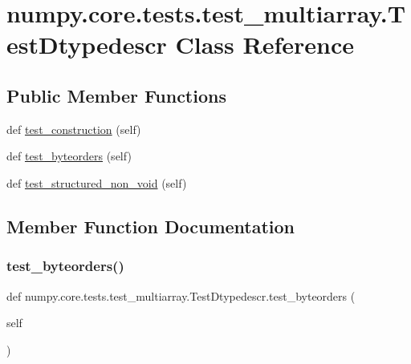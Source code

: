 \hypertarget{classnumpy_1_1core_1_1tests_1_1test__multiarray_1_1TestDtypedescr}{}\section{numpy.\+core.\+tests.\+test\+\_\+multiarray.\+Test\+Dtypedescr Class Reference}
\label{classnumpy_1_1core_1_1tests_1_1test__multiarray_1_1TestDtypedescr}
\subsection*{Public Member Functions}
\begin{DoxyCompactItemize}
\item 
def \hyperlink{classnumpy_1_1core_1_1tests_1_1test__multiarray_1_1TestDtypedescr_a2d9b634b5a250aa2f56396d16b736e64}{test\+\_\+construction} (self)
\item 
def \hyperlink{classnumpy_1_1core_1_1tests_1_1test__multiarray_1_1TestDtypedescr_ae4485cca283de87d7e1fa61ab35105ea}{test\+\_\+byteorders} (self)
\item 
def \hyperlink{classnumpy_1_1core_1_1tests_1_1test__multiarray_1_1TestDtypedescr_a8e3d8e0d8ea78920395046af8f336c27}{test\+\_\+structured\+\_\+non\+\_\+void} (self)
\end{DoxyCompactItemize}


\subsection{Member Function Documentation}
\mbox{\label{classnumpy_1_1core_1_1tests_1_1test__multiarray_1_1TestDtypedescr_ae4485cca283de87d7e1fa61ab35105ea}} 
\subsubsection{\texorpdfstring{test\+\_\+byteorders()}{test\_byteorders()}}
{\footnotesize\ttfamily def numpy.\+core.\+tests.\+test\+\_\+multiarray.\+Test\+Dtypedescr.\+test\+\_\+byteorders (\begin{DoxyParamCaption}\item[{}]{self }\end{DoxyParamCaption})}

